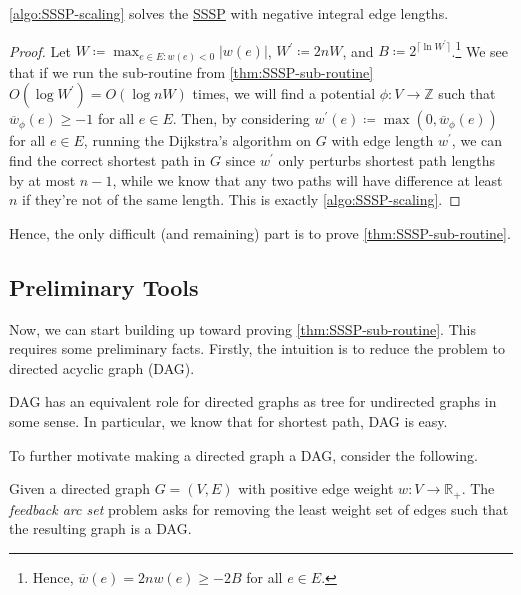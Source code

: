 \begin{theorem}\label{thm:SSSP}
	\autoref{algo:SSSP-scaling} solves the \hyperref[prb:SSSP]{SSSP} with negative integral edge lengths.
\end{theorem}
\begin{proof}
	Let \(W \coloneqq \max _{e\in E \colon w(e) < 0} \lvert w(e) \rvert \), \(W^{\prime} \coloneqq 2n W\), and \(B \coloneqq 2^{\lceil \ln W^{\prime} \rceil }\).\footnote{Hence, \(\overline{w} (e) = 2n w(e) \geq -2B\) for all \(e \in E\).} We see that if we run the sub-routine from \autoref{thm:SSSP-sub-routine} \(O(\log W^{\prime} ) = O(\log nW)\) times, we will find a potential \(\phi \colon V \to \mathbb{Z} \) such that \(\overline{w} _{\phi } (e) \geq -1 \) for all \(e \in E\). Then, by considering \(w^{\prime} (e) \coloneqq \max (0, \overline{w} _\phi (e))\) for all \(e \in E\), running the Dijkstra's algorithm on \(G\) with edge length \(w^{\prime}\), we can find the correct shortest path in \(G\) since \(w^{\prime} \) only perturbs shortest path lengths by at most \(n-1\), while we know that any two paths will have difference at least \(n\) if they're not of the same length. This is exactly \autoref{algo:SSSP-scaling}.
\end{proof}

Hence, the only difficult (and remaining) part is to prove \autoref{thm:SSSP-sub-routine}.

\subsection{Preliminary Tools}
Now, we can start building up toward proving \autoref{thm:SSSP-sub-routine}. This requires some preliminary facts. Firstly, the intuition is to reduce the problem to directed acyclic graph (DAG).

\begin{intuition}
	DAG has an equivalent role for directed graphs as tree for undirected graphs in some sense. In particular, we know that for shortest path, DAG is easy.
\end{intuition}

To further motivate making a directed graph a DAG, consider the following.

\begin{problem}\label{prb:feedback-arc-set}
Given a directed graph \(G = (V, E)\) with positive edge weight \(w \colon V \to \mathbb{R} _ +\). The \emph{feedback arc set} problem asks for removing the least weight set of edges such that the resulting graph is a DAG.
\end{problem}

